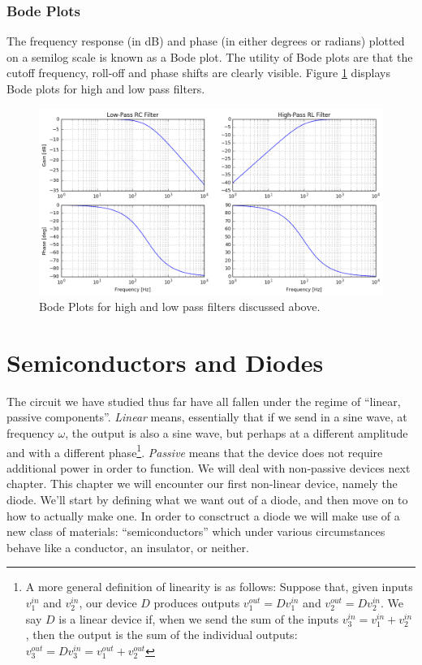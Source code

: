 \documentclass{tufte-book}
\begin{document}
\subsection{Bode Plots}
The frequency response (in dB) and phase (in either degrees or radians) plotted on a semilog scale is known as a Bode plot. The utility of Bode plots are that the cutoff frequency, roll-off and phase shifts are clearly visible. Figure \ref{fig:bode_filts} displays Bode plots for high and low pass filters.


\begin{figure}[h]
\caption{Bode Plots for high and low pass filters discussed above.}
\label{fig:bode_filts}
\begin{center}
\includegraphics[width=\textwidth]{bode_filts.png}
\end{center}
\end{figure}

\chapter{Semiconductors and Diodes}
The circuit we have studied thus far have all fallen under the regime of ``linear, passive components''. \textit{Linear} means, essentially that if we send in a sine wave, at frequency $\omega$, the output is also a sine wave, but perhaps at a different amplitude and with a different phase\footnote{A more general definition of linearity is as follows: Suppose that, given inputs $v_1^{in}$ and $v_2^{in}$, our device $D$ produces outputs $v_1^{out} = Dv_1^{in}$ and $v_2^{out} = Dv_2^{in}$. We say $D$ is a linear device if, when we send the sum of the inputs $v_3^{in} = v_1^{in} + v_2^{in}$, then the output is the sum of the individual outputs: $v_3^{out} = Dv_3^{in} =  v_1^{out} + v_2^{out}$}. \textit{Passive} means that the device does not require additional power in order to function. We will deal with non-passive devices next chapter. This chapter we will encounter our first non-linear device, namely the diode. We'll start by defining what we want out of a diode, and then move on to how to actually make one. In order to consctruct a diode we will make use of a new class of materials: ``semiconductors'' which under various circumstances behave like a conductor, an insulator, or neither.
\end{document}
